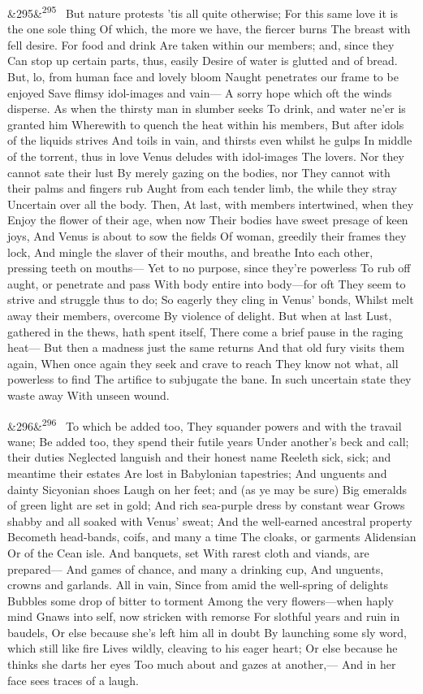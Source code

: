 \documentclass[12pt]{article}
\newcommand{\para}[1][]{\par\noindent\ifx&#1&\else\textsuperscript{\footnotesize #1}~\fi}
\begin{document}
\para[295] But nature protests 'tis all quite otherwise; For this same love it is the one sole thing Of which, the more we have, the fiercer burns The breast with fell desire. For food and drink Are taken within our members; and, since they Can stop up certain parts, thus, easily Desire of water is glutted and of bread. But, lo, from human face and lovely bloom Naught penetrates our frame to be enjoyed Save flimsy idol-images and vain--- A sorry hope which oft the winds disperse. As when the thirsty man in slumber seeks To drink, and water ne'er is granted him Wherewith to quench the heat within his members, But after idols of the liquids strives And toils in vain, and thirsts even whilst he gulps In middle of the torrent, thus in love Venus deludes with idol-images The lovers. Nor they cannot sate their lust By merely gazing on the bodies, nor They cannot with their palms and fingers rub Aught from each tender limb, the while they stray Uncertain over all the body. Then, At last, with members intertwined, when they Enjoy the flower of their age, when now Their bodies have sweet presage of keen joys, And Venus is about to sow the fields Of woman, greedily their frames they lock, And mingle the slaver of their mouths, and breathe Into each other, pressing teeth on mouths--- Yet to no purpose, since they're powerless To rub off aught, or penetrate and pass With body entire into body---for oft They seem to strive and struggle thus to do; So eagerly they cling in Venus' bonds, Whilst melt away their members, overcome By violence of delight. But when at last Lust, gathered in the thews, hath spent itself, There come a brief pause in the raging heat--- But then a madness just the same returns And that old fury visits them again, When once again they seek and crave to reach They know not what, all powerless to find The artifice to subjugate the bane. In such uncertain state they waste away With unseen wound.

\para[296] To which be added too, They squander powers and with the travail wane; Be added too, they spend their futile years Under another's beck and call; their duties Neglected languish and their honest name Reeleth sick, sick; and meantime their estates Are lost in Babylonian tapestries; And unguents and dainty Sicyonian shoes Laugh on her feet; and (as ye may be sure) Big emeralds of green light are set in gold; And rich sea-purple dress by constant wear Grows shabby and all soaked with Venus' sweat; And the well-earned ancestral property Becometh head-bands, coifs, and many a time The cloaks, or garments Alidensian Or of the Cean isle. And banquets, set With rarest cloth and viands, are prepared--- And games of chance, and many a drinking cup, And unguents, crowns and garlands. All in vain, Since from amid the well-spring of delights Bubbles some drop of bitter to torment Among the very flowers---when haply mind Gnaws into self, now stricken with remorse For slothful years and ruin in baudels, Or else because she's left him all in doubt By launching some sly word, which still like fire Lives wildly, cleaving to his eager heart; Or else because he thinks she darts her eyes Too much about and gazes at another,--- And in her face sees traces of a laugh.
\end{document}
